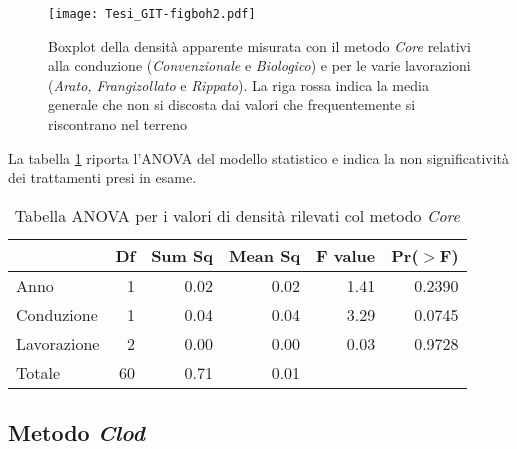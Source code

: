 \documentclass[a4paper]{article}
\begin{document}
\begin{figure}[hb]
  \centering
  \texttt{[image: Tesi\_GIT-figboh2.pdf]}

  \caption[Boxplot della densità apparente: metodo
  \emph{Core}]{Boxplot della densità apparente misurata con il metodo
    \emph{Core} relativi alla conduzione (\emph{Convenzionale} e
    \emph{Biologico}) e per le varie lavorazioni (\emph{Arato,
      Frangizollato} e \emph{Rippato}). La riga rossa indica la media
    generale che non si discosta dai valori che frequentemente si
    riscontrano nel terreno }
  \label{fig:boxplotCore}
\end{figure}
\FloatBarrier




La tabella \ref{tab:anova_del_modello} riporta l'ANOVA del modello
statistico e indica la non significatività dei trattamenti presi in
esame.


\begin{table}[ht]
\centering
\caption{Tabella ANOVA per i valori di densità rilevati col metodo \emph{Core}} 
\label{tab:anova_del_modello}
\begin{tabular}{lrrrrr}
  \hline
 & Df & Sum Sq & Mean Sq & F value & Pr($>$F) \\ 
  \hline
Anno & 1 & 0.02 & 0.02 & 1.41 & 0.2390 \\ 
  Conduzione & 1 & 0.04 & 0.04 & 3.29 & 0.0745 \\ 
  Lavorazione & 2 & 0.00 & 0.00 & 0.03 & 0.9728 \\ 
  Totale & 60 & 0.71 & 0.01 &  &  \\ 
   \hline
\end{tabular}
\end{table}




\subsection{Metodo \emph{Clod}}
\end{document}
